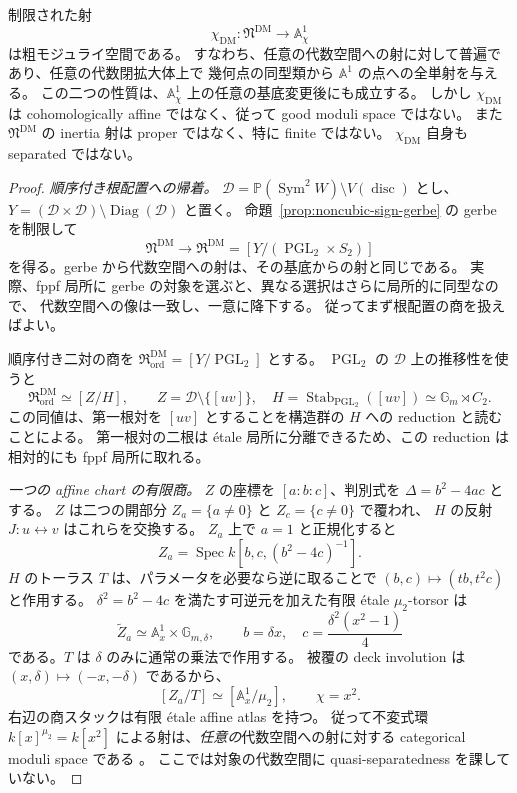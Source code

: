 \begin{theorem}[粗空間は存在するが良モジュライ射にはならない]
\label{thm:noncubic-dm-coarse}
制限された射
\[
 \chi_{\mathrm{DM}}:\mathfrak N^{\mathrm{DM}}\longrightarrow\mathbb A^1_\chi
\]
は粗モジュライ空間である。
すなわち、任意の代数空間への射に対して普遍であり、任意の代数閉拡大体上で
幾何点の同型類から $\mathbb A^1$ の点への全単射を与える。
この二つの性質は、$\mathbb A^1_\chi$ 上の任意の基底変更後にも成立する。
しかし $\chi_{\mathrm{DM}}$ は cohomologically affine ではなく、従って good moduli space ではない。
また $\mathfrak N^{\mathrm{DM}}$ の inertia 射は proper ではなく、特に finite ではない。
$\chi_{\mathrm{DM}}$ 自身も separated ではない。
\end{theorem}

\begin{proof}
\emph{順序付き根配置への帰着。}
$\mathcal D=\mathbb P(\operatorname{Sym}^2W)\setminus V(\operatorname{disc})$ とし、
$Y=(\mathcal D\times\mathcal D)\setminus\operatorname{Diag}(\mathcal D)$ と置く。
命題~\ref{prop:noncubic-sign-gerbe} の gerbe を制限して
\[
 \mathfrak N^{\mathrm{DM}}\longrightarrow
 \mathfrak R^{\mathrm{DM}}=[Y/(\operatorname{PGL}_2\times S_2)]
\]
を得る。gerbe から代数空間への射は、その基底からの射と同じである。
実際、fppf 局所に gerbe の対象を選ぶと、異なる選択はさらに局所的に同型なので、
代数空間への像は一致し、一意に降下する。
従ってまず根配置の商を扱えばよい。

順序付き二対の商を $\mathfrak R_{\mathrm{ord}}^{\mathrm{DM}}=[Y/\operatorname{PGL}_2]$ とする。
$\operatorname{PGL}_2$ の $\mathcal D$ 上の推移性を使うと
\[
 \mathfrak R_{\mathrm{ord}}^{\mathrm{DM}}
 \simeq[Z/H],\qquad
 Z=\mathcal D\setminus\{[uv]\},\quad
 H=\operatorname{Stab}_{\operatorname{PGL}_2}([uv])
   \simeq\mathbb G_m\rtimes C_2.
\]
この同値は、第一根対を $[uv]$ とすることを構造群の $H$ への reduction と読むことによる。
第一根対の二根は étale 局所に分離できるため、この reduction は相対的にも fppf 局所に取れる。

\emph{一つの affine chart の有限商。}
$Z$ の座標を $[a:b:c]$、判別式を $\Delta=b^2-4ac$ とする。
$Z$ は二つの開部分 $Z_a=\{a\ne0\}$ と $Z_c=\{c\ne0\}$ で覆われ、
$H$ の反射 $J:u\leftrightarrow v$ はこれらを交換する。
$Z_a$ 上で $a=1$ と正規化すると
\[
 Z_a=\operatorname{Spec}k[b,c,(b^2-4c)^{-1}].
\]
$H$ のトーラス $T$ は、パラメータを必要なら逆に取ることで
$(b,c)\mapsto(tb,t^2c)$ と作用する。
$\delta^2=b^2-4c$ を満たす可逆元を加えた有限 étale $\mu_2$-torsor は
\[
 \widetilde Z_a\simeq\mathbb A^1_x\times\mathbb G_{m,\delta},
 \qquad b=\delta x,\quad c=\frac{\delta^2(x^2-1)}4
\]
である。$T$ は $\delta$ のみに通常の乗法で作用する。
被覆の deck involution は $(x,\delta)\mapsto(-x,-\delta)$ であるから、
\begin{equation}\label{eq:noncubic-dm-affine-slice}
 [Z_a/T]\simeq[\mathbb A^1_x/\mu_2],\qquad \chi=x^2.
\end{equation}
右辺の商スタックは有限 étale affine atlas を持つ。
従って不変式環 $k[x]^{\mu_2}=k[x^2]$ による射は、\emph{任意の}代数空間への射に対する
categorical moduli space である
\cite[Tags 0DUP, 0DUR; Lemmas 106.13.4 and 106.13.6]{StacksDMCoarse}。
ここでは対象の代数空間に quasi-separatedness を課していない。


\end{proof}

